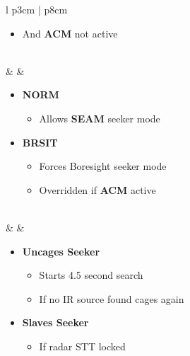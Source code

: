 \documentclass[8pt,usenames,dvipsnames,twoside]{article}
\begin{document}
\begin{center}
\begin{longtable}{l p{3cm} | p{8cm}}
\begin{minipage}[t]{\linewidth}
\begin{itemize}
\begin{itemize}
							\item And \textbf{ACM} not active
						\end{itemize}
					\end{itemize}
				\end{minipage} \\
				\midrule
				\textbullet &   & 
				\begin{minipage}[t]{\linewidth}
					\vspace{-7pt}
					\begin{itemize}
						\item \textbf{NORM}
						\begin{itemize}
							\item Allows \textbf{SEAM} seeker mode
						\end{itemize}
						\item \textbf{BRSIT}
						\begin{itemize}
							\item Forces Boresight seeker mode
							\item Overridden if \textbf{ACM} active
						\end{itemize}
					\end{itemize}
				\end{minipage} \\
				\midrule
				\textbullet &   \hfill\null {} & 
				\begin{minipage}[t]{\linewidth}
					\vspace{-7pt}
					\begin{itemize}
						\item \textbf{Uncages Seeker}
						\begin{itemize}
							\item Starts 4.5 second search
							\item If no IR source found cages again
						\end{itemize}
						\item \textbf{Slaves Seeker}
						\begin{itemize}
							\item If radar STT locked
						\end{itemize}
					\end{itemize}
				\end{minipage} \\
				\bottomrule
			\end{longtable}
		\end{center}
	
\end{document}
